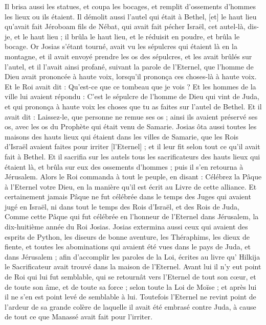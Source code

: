 \begin{multicols}{2}
Il brisa aussi les statues, et coupa les bocages, et remplit d'ossements d'hommes les lieux ou ils étaient.
Il démolit aussi l'autel qui était à Bethel, [et] le haut lieu qu'avait fait Jéroboam fils de Nébat, qui avait fait pécher Israël, cet autel-là, dis-je, et le haut lieu ; il brûla le haut lieu, et le réduisit en poudre, et brûla le bocage.
Or Josias s'étant tourné, avait vu les sépulcres qui étaient là en la montagne, et il avait envoyé prendre les os des sépulcres, et les avait brûlés sur l'autel, et il l'avait ainsi profané, suivant la parole de l'Eternel, que l'homme de Dieu avait prononcée à haute voix, lorsqu'il prononça ces choses-là à haute voix.
Et le Roi avait dit : Qu'est-ce que ce tombeau que je vois ? Et les hommes de la ville lui avaient répondu : C'est le sépulcre de l'homme de Dieu qui vint de Juda, et qui prononça à haute voix les choses que tu as faites sur l'autel de Bethel.
Et il avait dit : Laissez-le, que personne ne remue ses os ; ainsi ils avaient préservé ses os, avec les os du Prophète qui était venu de Samarie.
Josias ôta aussi toutes les maisons des hauts lieux qui étaient dans les villes de Samarie, que les Rois d'Israël avaient faites pour irriter [l'Eternel] ; et il leur fit selon tout ce qu'il avait fait à Bethel.
Et il sacrifia sur les autels tous les sacrificateurs des hauts lieux qui étaient là, et brûla sur eux des ossements d'hommes ; puis il s'en retourna à Jérusalem.
Alors le Roi commanda à tout le peuple, en disant : Célébrez la Pâque à l'Eternel votre Dieu, en la manière qu'il est écrit au Livre de cette alliance.
Et certainement jamais Pâque ne fut célébrée dans le temps des Juges qui avaient jugé en Israël, ni dans tout le temps des Rois d'Israël, et des Rois de Juda,
Comme cette Pâque qui fut célébrée en l'honneur de l'Eternel dans Jérusalem, la dix-huitième année du Roi Josias.
Josias extermina aussi ceux qui avaient des esprits de Python, les diseurs de bonne aventure, les Théraphims, les dieux de fiente, et toutes les abominations qui avaient été vues dans le pays de Juda, et dans Jérusalem ; afin d'accomplir les paroles de la Loi, écrites au livre qu' Hilkija le Sacrificateur avait trouvé dans la maison de l'Eternel.
Avant lui il n'y eut point de Roi qui lui fut semblable, qui se retournât vers l'Eternel de tout son cœur, et de toute son âme, et de toute sa force ; selon toute la Loi de Moïse ; et après lui il ne s'en est point levé de semblable à lui.
Toutefois l'Eternel ne revint point de l'ardeur de sa grande colère de laquelle il avait été embrasé contre Juda, à cause de tout ce que Manassé avait fait pour l'irriter.

\end{multicols}
